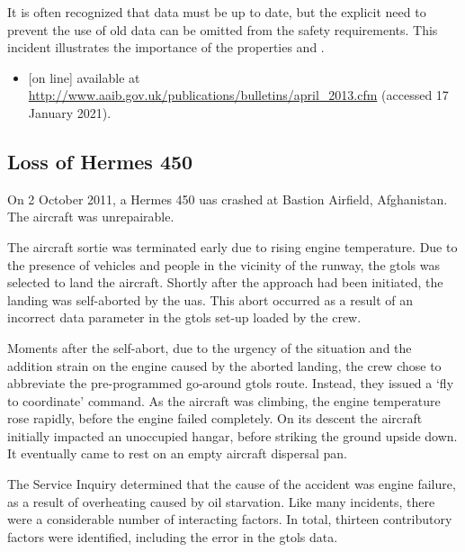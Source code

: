It is often recognized that data must be up to date, but the explicit need to prevent the use of old data can be omitted from the safety requirements. This incident illustrates the importance of the properties  and . 

    
\begin{itemize}
\item \raggedright{ [on line] available at \href{http://www.aaib.gov.uk/publications/bulletins/april_2013.cfm}{http://www.aaib.gov.uk/publications/bulletins/april\_2013.cfm} (accessed 17 January 2021).}
\end{itemize}
    
\subsection{Loss of Hermes 450} \label{bkm:incacc:hermes450}
On 2 October 2011, a Hermes 450 \gls{uas} crashed at Bastion Airfield, Afghanistan. The aircraft was unrepairable.

The aircraft sortie was terminated early due to rising engine temperature. Due to the presence of vehicles and people in the vicinity of the runway, the \gls{gtols} was selected to land the aircraft. Shortly after the approach had been initiated, the landing was self-aborted by the \gls{uas}. This abort occurred as a result of an incorrect data parameter in the \gls{gtols} set-up loaded by the crew.

Moments after the self-abort, due to the urgency of the situation and the addition strain on the engine caused by the aborted landing, the crew chose to abbreviate the pre-programmed go-around \gls{gtols} route. Instead, they issued a `fly to coordinate' command. As the aircraft was climbing, the engine temperature rose rapidly, before the engine failed completely. On its descent the aircraft initially impacted an unoccupied hangar, before striking the ground upside down. It eventually came to rest on an empty aircraft dispersal pan.

The Service Inquiry determined that the cause of the accident was engine failure, as a result of overheating caused by oil starvation. Like many incidents, there were a considerable number of interacting factors. In total, thirteen contributory factors were identified, including the error in the \gls{gtols} data.

